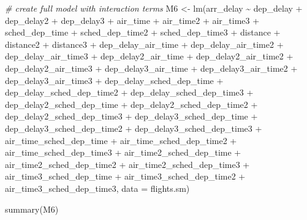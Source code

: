 \documentclass[
]{article}
\newenvironment{Shaded}{\begin{snugshade}}{\end{snugshade}}
\newcommand{\AttributeTok}[1]{\textcolor[rgb]{0.77,0.63,0.00}{#1}}
\newcommand{\CommentTok}[1]{\textcolor[rgb]{0.56,0.35,0.01}{\textit{#1}}}
\newcommand{\FunctionTok}[1]{\textcolor[rgb]{0.00,0.00,0.00}{#1}}
\newcommand{\NormalTok}[1]{#1}
\newcommand{\OtherTok}[1]{\textcolor[rgb]{0.56,0.35,0.01}{#1}}
\newcommand{\SpecialCharTok}[1]{\textcolor[rgb]{0.00,0.00,0.00}{#1}}
\begin{document}
\begin{Shaded}
\begin{Highlighting}[]
\CommentTok{\# create full model with interaction terms}
\NormalTok{M6 }\OtherTok{\textless{}{-}} \FunctionTok{lm}\NormalTok{(arr\_delay }\SpecialCharTok{\textasciitilde{}}\NormalTok{ dep\_delay }\SpecialCharTok{+}\NormalTok{ dep\_delay2 }\SpecialCharTok{+}\NormalTok{ dep\_delay3 }\SpecialCharTok{+}\NormalTok{ air\_time }\SpecialCharTok{+}
\NormalTok{    air\_time2 }\SpecialCharTok{+}\NormalTok{ air\_time3 }\SpecialCharTok{+}\NormalTok{ sched\_dep\_time }\SpecialCharTok{+}\NormalTok{ sched\_dep\_time2 }\SpecialCharTok{+}
\NormalTok{    sched\_dep\_time3 }\SpecialCharTok{+}\NormalTok{ distance }\SpecialCharTok{+}\NormalTok{ distance2 }\SpecialCharTok{+}\NormalTok{ distance3 }\SpecialCharTok{+}\NormalTok{ dep\_delay\_air\_time }\SpecialCharTok{+}
\NormalTok{    dep\_delay\_air\_time2 }\SpecialCharTok{+}\NormalTok{ dep\_delay\_air\_time3 }\SpecialCharTok{+}\NormalTok{ dep\_delay2\_air\_time }\SpecialCharTok{+}
\NormalTok{    dep\_delay2\_air\_time2 }\SpecialCharTok{+}\NormalTok{ dep\_delay2\_air\_time3 }\SpecialCharTok{+}\NormalTok{ dep\_delay3\_air\_time }\SpecialCharTok{+}
\NormalTok{    dep\_delay3\_air\_time2 }\SpecialCharTok{+}\NormalTok{ dep\_delay3\_air\_time3 }\SpecialCharTok{+}\NormalTok{ dep\_delay\_sched\_dep\_time }\SpecialCharTok{+}
\NormalTok{    dep\_delay\_sched\_dep\_time2 }\SpecialCharTok{+}\NormalTok{ dep\_delay\_sched\_dep\_time3 }\SpecialCharTok{+}\NormalTok{ dep\_delay2\_sched\_dep\_time }\SpecialCharTok{+}
\NormalTok{    dep\_delay2\_sched\_dep\_time2 }\SpecialCharTok{+}\NormalTok{ dep\_delay2\_sched\_dep\_time3 }\SpecialCharTok{+}
\NormalTok{    dep\_delay3\_sched\_dep\_time }\SpecialCharTok{+}\NormalTok{ dep\_delay3\_sched\_dep\_time2 }\SpecialCharTok{+}
\NormalTok{    dep\_delay3\_sched\_dep\_time3 }\SpecialCharTok{+}\NormalTok{ air\_time\_sched\_dep\_time }\SpecialCharTok{+}\NormalTok{ air\_time\_sched\_dep\_time2 }\SpecialCharTok{+}
\NormalTok{    air\_time\_sched\_dep\_time3 }\SpecialCharTok{+}\NormalTok{ air\_time2\_sched\_dep\_time }\SpecialCharTok{+}\NormalTok{ air\_time2\_sched\_dep\_time2 }\SpecialCharTok{+}
\NormalTok{    air\_time2\_sched\_dep\_time3 }\SpecialCharTok{+}\NormalTok{ air\_time3\_sched\_dep\_time }\SpecialCharTok{+}\NormalTok{ air\_time3\_sched\_dep\_time2 }\SpecialCharTok{+}
\NormalTok{    air\_time3\_sched\_dep\_time3, }\AttributeTok{data =}\NormalTok{ flights.sm)}

\FunctionTok{summary}\NormalTok{(M6)}
\end{Highlighting}
\end{Shaded}
\end{document}
